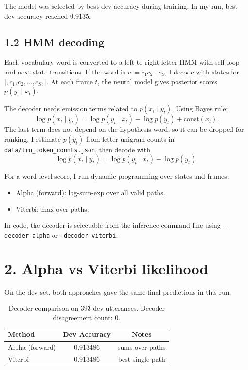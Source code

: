 \documentclass[11pt]{article}
\begin{document}
The model was selected by best dev accuracy during training. In my run, best dev accuracy reached 0.9135.

\subsection*{1.2 HMM decoding}
Each vocabulary word is converted to a left-to-right letter HMM with self-loop and next-state transitions.
If the word is $w = c_1 c_2 \dots c_S$, I decode with states for
$|, c_1, c_2, \dots, c_S, |$.
At each frame $t$, the neural model gives posterior scores $p(y_t\mid x_t)$.

The decoder needs emission terms related to $p(x_t\mid y_t)$.
Using Bayes rule:
\[
\log p(x_t\mid y_t) = \log p(y_t\mid x_t) - \log p(y_t) + \text{const}(x_t).
\]
The last term does not depend on the hypothesis word, so it can be dropped for ranking.
I estimate $p(y_t)$ from letter unigram counts in \texttt{data/trn\_token\_counts.json}, then decode with
\[
\log \tilde p(x_t\mid y_t) = \log p(y_t\mid x_t) - \log p(y_t).
\]

For a word-level score, I run dynamic programming over states and frames:
\begin{itemize}
    \item Alpha (forward): log-sum-exp over all valid paths.
    \item Viterbi: max over paths.
\end{itemize}
In code, the decoder is selectable from the inference command line using
\texttt{--decoder alpha} or \texttt{--decoder viterbi}.

\section*{2. Alpha vs Viterbi likelihood}
On the dev set, both approaches gave the same final predictions in this run.

\begin{table}[H]
\centering
\begin{tabular}{lcc}
\toprule
Method & Dev Accuracy & Notes \\
\midrule
Alpha (forward) & 0.913486 & sums over paths \\
Viterbi & 0.913486 & best single path \\
\bottomrule
\end{tabular}
\caption{Decoder comparison on 393 dev utterances. Decoder disagreement count: 0.}
\end{table}
\end{document}
